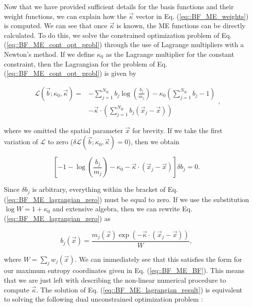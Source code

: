 Now that we have provided sufficient details for the basis functions and their weight functions, we can explain how the $\vec{\kappa}$ vector in Eq. (\ref{eq::BF_ME_weights}) is computed. We can see that once $\vec{\kappa}$ is known, the ME functions can be directly calculated. To do this, we solve the constrained optimization problem of Eq. (\ref{eq::BF_ME_cont_opt_probl}) through the use of Lagrange multipliers with a Newton's method. If we define $\kappa_0$ as the Lagrange multiplier for the constant constraint, then the Lagrangian for the problem of Eq. (\ref{eq::BF_ME_cont_opt_probl}) is given by

\begin{equation}
\label{eq::BF_ME_lagrangian}
\begin{aligned}
\mathcal{L} (\vec{b}; \kappa_0, \vec{\kappa} ) = &- \sum_{j=1}^{N_K} b_j \log \left(  \frac{b_j}{m_j} \right) - \kappa_0 \left(  \sum_{j=1}^{N_K} b_j - 1 \right) \\
&- \vec{\kappa} \cdot \left(  \sum_{j=1}^{N_K} b_j \left( \vec{x}_j - \vec{x} \right) \right)
\end{aligned} ,
\end{equation}

\noindent where we omitted the spatial parameter $\vec{x}$ for brevity. If we take the first variation of $\mathcal{L}$ to zero ($\delta \mathcal{L} (\vec{b}; \kappa_0, \vec{\kappa} ) = 0$), then we obtain

\begin{equation}
\label{eq::BF_ME_lagrangian_zero}
\left[ -1 - \log \left(  \frac{b_j}{m_j} \right) - \kappa_0 - \vec{\kappa} \cdot \left( \vec{x}_j - \vec{x} \right)  \right] \delta b_j = 0 .
\end{equation}

\noindent Since $\delta b_j $ is arbitrary, everything within the bracket of Eq. (\ref{eq::BF_ME_lagrangian_zero}) must be equal to zero. If we use the substitution $\log W= 1 + \kappa_0$ and extensive algebra, then we can rewrite Eq. (\ref{eq::BF_ME_lagrangian_zero}) as

\begin{equation}
\label{eq::BF_ME_lagrangian_result}
b_j (\vec{x}) = \frac{m_j(\vec{x}) \exp(-  \vec{\kappa} \cdot (\vec{x}_j - \vec{x}))}{W} ,
\end{equation}

\noindent where $W = \sum_j w_j (\vec{x})$. We can immediately see that this satisfies the form for our maximum entropy coordinates given in Eq. (\ref{eq::BF_ME_BF}). This means that we are just left with describing the non-linear numerical procedure to compute $\vec{\kappa}$. The solution of Eq. (\ref{eq::BF_ME_lagrangian_result}) is equivalent to solving the following dual unconstrained optimization problem \cite{boyd2004convex}:

